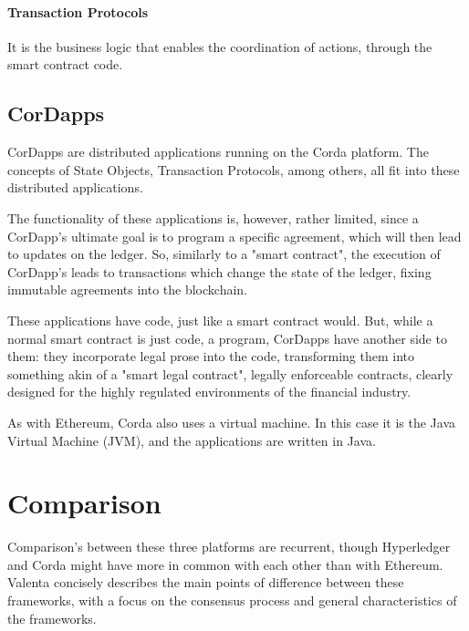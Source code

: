 \paragraph{Transaction Protocols} It is the business logic that enables the coordination of actions, through the smart contract code.



\subsection{CorDapps}
CorDapps are distributed applications running on the Corda platform. The concepts of State Objects, Transaction Protocols, among others, all fit into these distributed applications.

The functionality of these applications is, however, rather limited, since a CorDapp's ultimate goal is to program a specific agreement, which will then lead to updates on the ledger. So, similarly to a "smart contract", the execution of CorDapp's leads to transactions which change the state of the ledger, fixing immutable agreements into the blockchain.

These applications have code, just like a smart contract would. But, while a normal smart contract is just code, a program, CorDapps have another side to them: they incorporate legal prose into the code, transforming them into something akin of a "smart legal contract", legally enforceable contracts, clearly designed for the highly regulated environments of the financial industry.

As with Ethereum, Corda also uses a virtual machine. In this case it is the Java Virtual Machine (JVM), and the applications are written in Java.


\section{Comparison}
Comparison's between these three platforms are recurrent, though Hyperledger and Corda might have more in common with each other than with Ethereum. 
Valenta \cite{Valenta2017} concisely describes the main points of difference between these frameworks, with a focus on the consensus process and general characteristics of the frameworks. 

